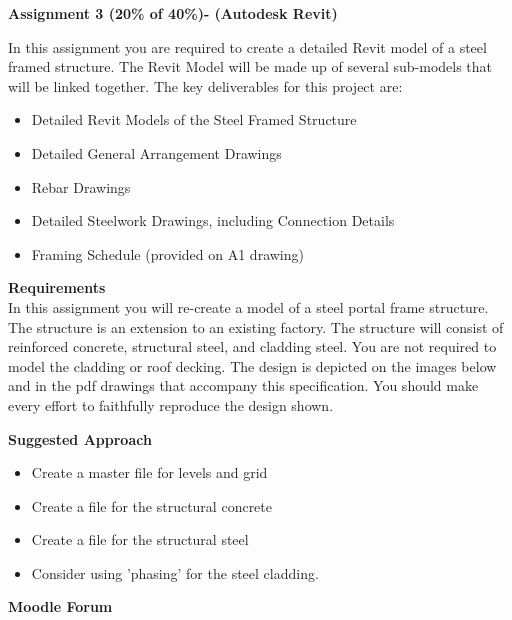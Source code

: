 
	
\begin{flushleft}
\Large\textbf{Assignment 3 (20\% of 40\%)- (Autodesk Revit) }\\
\end{flushleft}

In this assignment you are required to create a detailed Revit model of a steel framed structure.  The Revit Model will be made up of several sub-models that will be linked together.  The key deliverables for this project are:

\begin{itemize}
	\item Detailed Revit Models of the Steel Framed Structure
	\item Detailed General Arrangement Drawings
	\item Rebar Drawings
	\item Detailed Steelwork Drawings, including Connection Details
	\item Framing Schedule (provided on A1 drawing) 
\end{itemize}

\textbf{Requirements}\\


In this assignment you will re-create a model of a steel portal frame structure.  The structure is an extension to an existing factory.  The structure will consist of reinforced concrete, structural steel, and cladding steel.  You are not required to model the cladding or roof decking.  The design is depicted on the images below and in the pdf drawings that accompany this specification.  You should make every effort to faithfully reproduce the design shown.

\vspace{.5cm}

\textbf{Suggested Approach}

\begin{itemize}
	\item Create a master file for levels and grid
	\item Create a file for the structural concrete
	\item Create a file for the structural steel
	\item Consider using 'phasing' for the steel cladding.
\end{itemize}


\vspace{.5cm}

\textbf{Moodle Forum}\\

